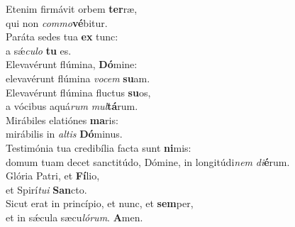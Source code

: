 \evenverse Etenim firmávit orbem \textbf{ter}ræ,~\*\\
\evenverse qui non \textit{com}\textit{mo}\textbf{vé}bitur.\\
\oddverse Paráta sedes tua \textbf{ex} tunc:~\*\\
\oddverse a sǽ\textit{cu}\textit{lo} \textbf{tu} es.\\
\evenverse Elevavérunt flúmina, \textbf{Dó}mine:~\*\\
\evenverse elevavérunt flúmina \textit{vo}\textit{cem} \textbf{su}am.\\
\oddverse Elevavérunt flúmina fluctus \textbf{su}os,~\*\\
\oddverse a vócibus aquá\textit{rum} \textit{mul}\textbf{tá}rum.\\
\evenverse Mirábiles elatiónes \textbf{ma}ris:~\*\\
\evenverse mirábilis in \textit{al}\textit{tis} \textbf{Dó}minus.\\
\oddverse Testimónia tua credibília facta sunt \textbf{ni}mis:~\*\\
\oddverse domum tuam decet sanctitúdo, Dómine, in longitúdi\textit{nem} \textit{di}\textbf{é}rum.\\
\evenverse Glória Patri, et \textbf{Fí}lio,~\*\\
\evenverse et Spirí\textit{tu}\textit{i} \textbf{San}cto.\\
\oddverse Sicut erat in princípio, et nunc, et \textbf{sem}per,~\*\\
\oddverse et in sǽcula sæcu\textit{ló}\textit{rum}. \textbf{A}men.\\
